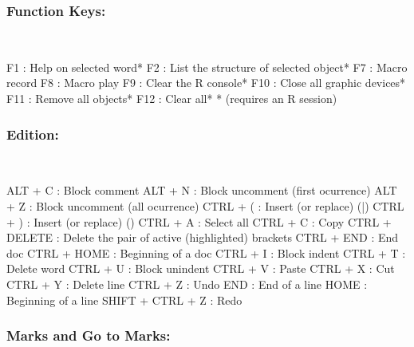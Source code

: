 \subsubsection{Function Keys:}\\

\vspace{-0.5cm}
\begin{Rtables}[caption={[Function keys]
    Function keys},
  label=hotkey:function]
  F1  : Help on selected word*
  F2  : List the structure of selected object*
  F7  : Macro record
  F8  : Macro play
  F9  : Clear the R console*
  F10 : Close all graphic devices*
  F11 : Remove all objects*
  F12 : Clear all*
  * (requires an R session)
\end{Rtables}


\newpage
\subsubsection{Edition:}\\

\vspace{-0.5cm}
\begin{Rtables}[caption={[Edition keyboard shortcuts]
    Edition keyboard shortcuts},
  label=hotkey:editions]
  ALT   + C        : Block comment
  ALT   + N        : Block uncomment (first ocurrence)
  ALT   + Z        : Block uncomment (all ocurrence)
  CTRL  + (        : Insert (or replace) (|)
  CTRL  + )        : Insert (or replace) ()
  CTRL  + A        : Select all
  CTRL  + C        : Copy
  CTRL  + DELETE   : Delete the pair of active (highlighted) brackets
  CTRL  + END      : End doc
  CTRL  + HOME     : Beginning of a doc
  CTRL  + I        : Block indent
  CTRL  + T        : Delete word
  CTRL  + U        : Block unindent
  CTRL  + V        : Paste
  CTRL  + X        : Cut
  CTRL  + Y        : Delete line
  CTRL  + Z        : Undo
  END              : End of a line
  HOME             : Beginning of a line
  SHIFT + CTRL + Z : Redo
\end{Rtables}


\subsubsection{Marks and Go to Marks:}\\

